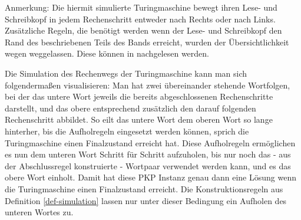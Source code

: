 \documentclass[]{scrartcl}
\begin{document}
			Anmerkung: Die hiermit simulierte Turingmaschine bewegt ihren Lese- und Schreibkopf in jedem Rechenschritt entweder nach Rechts oder nach Links. Zusätzliche Regeln, die benötigt werden wenn der Lese- und Schreibkopf den Rand des beschriebenen Teils des Bands erreicht, wurden der Übersichtlichkeit wegen weggelassen. Diese können in \cite{wegener} nachgelesen werden.
			
			Die Simulation des Rechenwegs der Turingmaschine kann man sich folgendermaßen visualisieren: Man hat zwei übereinander stehende Wortfolgen, bei der das untere Wort jeweils die bereits abgeschlossenen Rechenschritte darstellt, und das obere entsprechend zusätzlich den darauf folgenden Rechenschritt abbildet. So eilt das untere Wort dem oberen Wort so lange hinterher, bis die Aufholregeln eingesetzt werden können, sprich die Turingmaschine einen Finalzustand erreicht hat. Diese Aufholregeln ermöglichen es nun dem unteren Wort Schritt für Schritt aufzuholen, bis nur noch das - aus der Abschlussregel konstruierte - Wortpaar verwendet werden kann, und es das obere Wort einholt. Damit hat diese PKP Instanz genau dann eine Lösung wenn die Turingmaschine einen Finalzustand erreicht. Die Konstruktionsregeln aus Definition \ref{def-simulation} lassen nur unter dieser Bedingung ein Aufholen des unteren Wortes zu.
			
\end{document}
